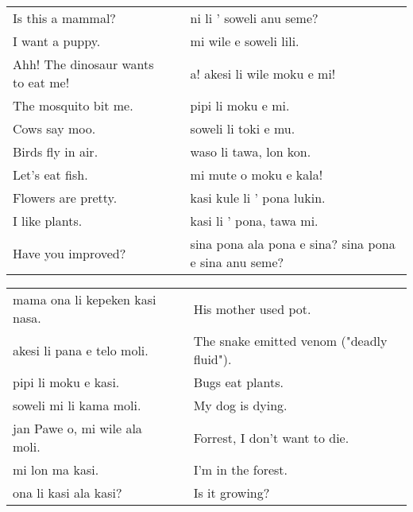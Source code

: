 \begin{supertabular}{p{5,5cm}|ll}
    Is this a mammal?                  &  & ni li ' soweli anu seme?                              \\ %
    I want a puppy.                    &  & mi wile e soweli lili.                                \\ %
    Ahh! The dinosaur wants to eat me! &  & a! akesi li wile moku e mi!                           \\ %
    The mosquito bit me.               &  & pipi li moku e mi.                                    \\ %
    Cows say moo.                      &  & soweli li toki e mu.                                  \\ %
    Birds fly in air.                  &  & waso li tawa, lon kon.                                \\ %
    Let's eat fish.                    &  & mi mute o moku e kala!                                \\ %
    Flowers are pretty.                &  & kasi kule li ' pona lukin.                            \\ %
    I like plants.                     &  & kasi li ' pona, tawa mi.                              \\ %
    Have you improved?                 &  & sina pona ala pona e sina? sina pona e sina anu seme? \\ %
\end{supertabular}

\begin{supertabular}{p{5,5cm}|ll}
    mama ona li kepeken kasi nasa. &  & His mother used pot.                      \\
    akesi li pana e telo moli.     &  & The snake emitted venom ("deadly fluid"). \\
    pipi li moku e kasi.           &  & Bugs eat plants.                          \\
    soweli mi li kama moli.        &  & My dog is dying.                          \\
    jan Pawe o, mi wile ala moli.  &  & Forrest, I don't want to die.             \\
    mi lon ma kasi.                &  & I'm in the forest.                        \\
    ona li kasi ala kasi?          &  & Is it growing?                            \\
\end{supertabular}

